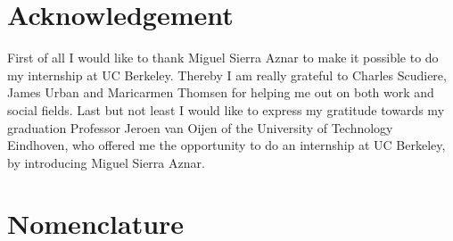 \section*{Acknowledgement}
First of all I would like to thank Miguel Sierra Aznar to make it possible to do my internship at UC Berkeley. Thereby I am really grateful to Charles Scudiere, James Urban and Maricarmen Thomsen for helping me out on both work and social fields. Last but not least I would like to express my gratitude towards my graduation Professor Jeroen van Oijen of the University of Technology Eindhoven, who offered me the opportunity to do an internship at UC Berkeley, by introducing Miguel Sierra Aznar. 

\newpage
\section*{Nomenclature}

